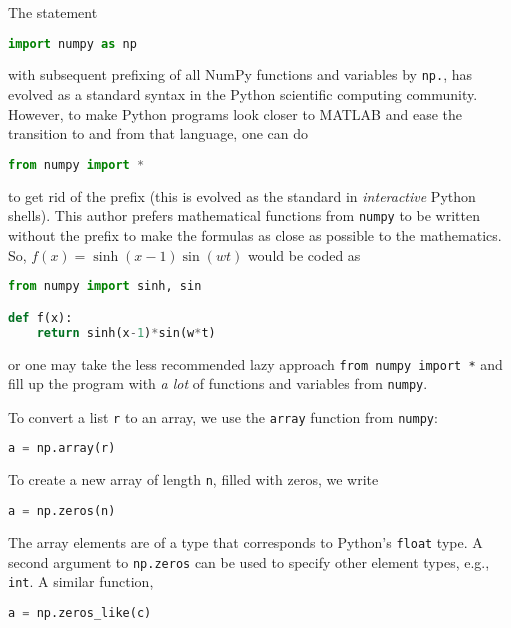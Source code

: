 \documentclass[graybox,sectrefs,envcountresetchap,open=right,final]{svmonodo}
\newenvironment{notice_mdfboxadmon}[1][]{
\begin{notice_mdfboxmdframed}[frametitle=#1]
}
{
\end{notice_mdfboxmdframed}
}
\begin{document}
\begin{notice_mdfboxadmon}
The statement
\begin{lstlisting}[language=Python,style=simple,xleftmargin=2mm]
import numpy as np

\end{lstlisting}

with subsequent prefixing of all NumPy functions and variables by \texttt{np.},
has evolved as a standard syntax in the Python scientific computing
community. However, to make Python programs look closer to MATLAB
and ease the transition to and from that language, one can do
\begin{lstlisting}[language=Python,style=simple,xleftmargin=2mm]
from numpy import *

\end{lstlisting}

to get rid of the prefix (this is evolved as the standard in
\emph{interactive} Python shells). This author prefers mathematical
functions from \texttt{numpy} to be written without the prefix to
make the formulas as close as possible to the mathematics.
So, $f(x)=\sinh(x-1)\sin(w t)$ would be coded as
\begin{lstlisting}[language=Python,style=simple,xleftmargin=2mm]
from numpy import sinh, sin

def f(x):
    return sinh(x-1)*sin(w*t)

\end{lstlisting}

or one may take the less recommended
lazy approach \texttt{from numpy import *} and fill up
the program with \emph{a lot} of functions and variables from \texttt{numpy}.
\end{notice_mdfboxadmon} %


To convert a list \texttt{r} to an array,
we use the \texttt{array} function
from \texttt{numpy}:
\begin{lstlisting}[language=Python,style=simple,xleftmargin=2mm]
a = np.array(r)

\end{lstlisting}

To create a new array of length \texttt{n}, filled with zeros, we write
\begin{lstlisting}[language=Python,style=simple,xleftmargin=2mm]
a = np.zeros(n)

\end{lstlisting}

The array elements are of a type that corresponds to Python's
\texttt{float} type. A second argument to \texttt{np.zeros} can be used to
specify other element types, e.g., \texttt{int}.
A similar function,
\begin{lstlisting}[language=Python,style=simple,xleftmargin=2mm]
a = np.zeros_like(c)

\end{lstlisting}
\end{document}
